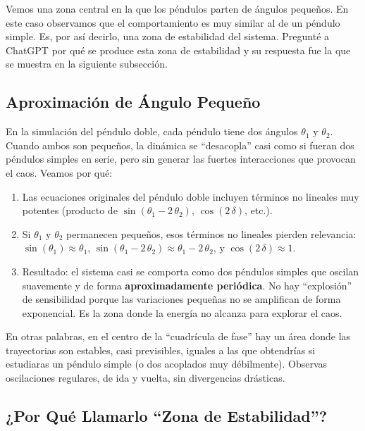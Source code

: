 \documentclass[
  10pt,
  a4paper,
  DIV=11,
  numbers=noendperiod,
  open=any]{scrreprt}
\providecommand{\tightlist}{%
  \setlength{\itemsep}{0pt}\setlength{\parskip}{0pt}}
\numberwithin{equation}{chapter}
\numberwithin{equation}{section}
\renewcommand{\[}{\begin{equation}}
\renewcommand{\]}{\end{equation}}
\begin{document}
Vemos una zona central en la que los péndulos parten de ángulos
pequeños. En este caso observamos que el comportamiento es muy similar
al de un péndulo simple. Es, por así decirlo, una zona de estabilidad
del sistema. Pregunté a ChatGPT por qué se produce esta zona de
estabilidad y su respuesta fue la que se muestra en la siguiente subsección.

\subsection{Aproximación de Ángulo
Pequeño}\label{aproximaciuxf3n-de-uxe1ngulo-pequeuxf1o}

En la simulación del péndulo doble, cada péndulo tiene dos ángulos
\(\theta_1\) y \(\theta_2\). Cuando ambos son pequeños, la dinámica se
``desacopla'' casi como si fueran dos péndulos simples en serie, pero
sin generar las fuertes interacciones que provocan el caos. Veamos por
qué:

\begin{enumerate}
\def\labelenumi{\arabic{enumi}.}
\tightlist
\item
  Las ecuaciones originales del péndulo doble incluyen términos no
  lineales muy potentes (producto de \(\sin(\theta_1 - 2\,\theta_2)\),
  \(\cos(2\,\delta)\), etc.).\\
\item
  Si \(\theta_1\) y \(\theta_2\) permanecen pequeños, esos términos no
  lineales pierden relevancia: \(\sin(\theta_1)\approx \theta_1\),
  \(\sin(\theta_1 - 2\,\theta_2)\approx \theta_1 - 2\,\theta_2\), y
  \(\cos(2\,\delta)\approx 1\).\\
\item
  Resultado: el sistema casi se comporta como dos péndulos simples que
  oscilan suavemente y de forma \textbf{aproximadamente periódica}. No
  hay ``explosión'' de sensibilidad porque las variaciones pequeñas no
  se amplifican de forma exponencial. Es la zona donde la energía no
  alcanza para explorar el caos.
\end{enumerate}

En otras palabras, en el centro de la ``cuadrícula de fase'' hay un área
donde las trayectorias son estables, casi previsibles, iguales a las que
obtendrías si estudiaras un péndulo simple (o dos acoplados muy
débilmente). Observas oscilaciones regulares, de ida y vuelta, sin
divergencias drásticas.

\subsection{¿Por Qué Llamarlo ``Zona de
Estabilidad''?}\label{por-quuxe9-llamarlo-zona-de-estabilidad}
\end{document}
